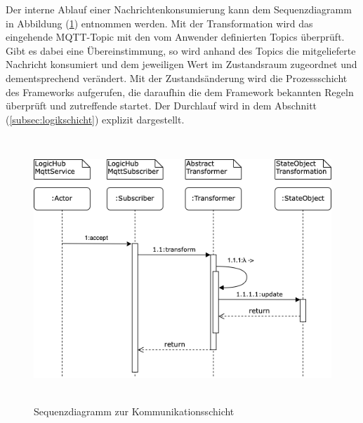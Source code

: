     \pagebreak
    Der interne Ablauf einer Nachrichtenkonsumierung kann dem Sequenzdiagramm in Abbildung (\ref{fig:kommunikationsequenz}) entnommen werden. Mit der Transformation 
    wird das eingehende \acs{MQTT}-Topic mit den vom Anwender definierten Topics überprüft. Gibt es dabei eine Übereinstimmung, so wird anhand des Topics die mitgelieferte 
    Nachricht konsumiert und dem jeweiligen Wert im Zustandsraum zugeordnet und dementsprechend verändert. Mit der Zustandsänderung wird die 
    Prozessschicht des Frameworks aufgerufen, die daraufhin die dem Framework bekannten Regeln überprüft und zutreffende startet. Der Durchlauf wird in dem Abschnitt (\ref{subsec:logikschicht}) 
    explizit dargestellt. 
    \begin{figure}[hbt!]
        \centering
        \includegraphics[width=14cm,height=10cm,keepaspectratio]{images/Kommunikationsschicht_Sequenz_Final.png}
        \caption{Sequenzdiagramm zur Kommunikationsschicht}
        \label{fig:kommunikationsequenz}
    \end{figure}

